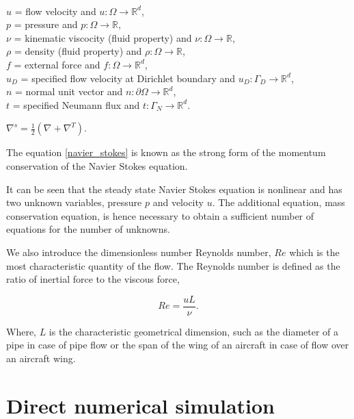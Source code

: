 \documentclass[a4paper,twoside,openright]{book}
\begin{document}
$ $\\
$u$ = flow velocity and $u:\Omega \rightarrow \mathbb{R}^d$,\\
$p$ = pressure and $p:\Omega \rightarrow \mathbb{R}$,\\
$\nu$ = kinematic viscocity (fluid property) and $\nu:\Omega \rightarrow \mathbb{R}$,\\ 
$\rho$ = density (fluid property) and $\rho:\Omega \rightarrow \mathbb{R}$,\\
$f$ = external force and $f:\Omega \rightarrow \mathbb{R}^d$,\\
$u_D$ = specified flow velocity at Dirichlet boundary and $u_D:\Gamma_D \rightarrow \mathbb{R}^d$,\\
$n$ = normal unit vector and $n:\partial \Omega \rightarrow \mathbb{R}^d$,\\
$t$ = specified Neumann flux and $t:\Gamma_N \rightarrow \mathbb{R}^d$.\\

\begin{center}
$\nabla^s = \frac{1}{2}(\nabla + \nabla^T) \textrm{.}$
\end{center}

The equation \eqref{navier_stokes} is known as the strong form of the momentum conservation of the Navier Stokes equation.

It can be seen that the steady state Navier Stokes equation is nonlinear and has two unknown variables, pressure $p$ and velocity $u$. The additional equation, mass conservation equation, is hence necessary to obtain a sufficient number of equations for the number of unknowns.

We also introduce the dimensionless number Reynolds number, $Re$ which is the most characteristic quantity of the flow. The Reynolds number is defined as the ratio of inertial force to the viscous force,

\begin{equation} \label{reynolds_number}
Re = \frac{uL}{\nu} \textrm{.}
\end{equation}

Where, $L$ is the characteristic geometrical dimension, such as the diameter of a pipe in case of pipe flow or the span of the wing of an aircraft in case of flow over an aircraft wing.\\

\section{Direct numerical simulation} 
\end{document}
